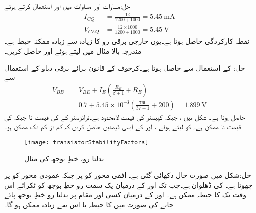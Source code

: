 حل:مساوات  اور مساوات  میں  اور  استعمال کرتے ہوئے
\begin{align*}
I_{CQ}&=\frac{12}{1200+1000}=\SI{5.45}{\milli \ampere}\\
V_{CEQ}&=\frac{12 \times 1000}{1200+1000}=\SI{5.45}{\volt}
\end{align*}
نقطہ کارکردگی حاصل ہوتا ہے۔یوں خارجی برقی رو کا زیادہ سے زیادہ ممکنہ حیطہ  ہے۔
مندرجہ بالا مثال میں  لیتے ہوئے  اور  حاصل کریں۔

حل: کے استعمال سے   حاصل ہوتا ہے۔کرخوف کے قانون برائے برقی دباو کے استعمال سے
\begin{align*}
V_{BB}&=V_{BE}+I_E \left(\frac{R_B}{\beta+1}+R_E \right)\\
&=0.7+5.45 \times 10^{-3} \left(\frac{760}{37+1}+200 \right)=\SI{1.899}{\volt}
\end{align*}
حاصل ہوتا ہے۔
شکل  میں ،  جبکہ کپیسٹر کی قیمت لامحدود ہے۔ٹرانزسٹر کے  کی قیمت  تا  جبکہ  کی قیمت  تا  ممکن ہے۔ کو  لیتے ہوئے ،  اور  کے ایسی قیمتیں حاصل کریں کہ  کم از کم  تک ممکن ہو۔ 
\begin{figure}
\centering
\texttt{[image: transistorStabilityFactors]}
\caption{بدلتا رو، خطِ بوجھ کی مثال}
\label{شکل_ٹرانزسٹر_بدلتی_رو_بار_خط_مثال}
\end{figure}

حل:شکل  میں صورت حال دکھائی گئی ہے۔ افقی محور کو  پر جبکہ عمودی محور کو  پر چھوتا ہے۔ کی ڈھلوان  ہے۔جب تک   اور  کے درمیان یک سمت رو خطِ بوجھ کو ٹکرائے اس وقت تک  کا حیطہ  ممکن ہے۔ اور  کے درمیان کسی اور مقام پر بدلتا رو خطِ بوجھ پائے جانے کی صورت میں  کا حیطہ  یا اس سے زیادہ ممکن ہو گا۔

